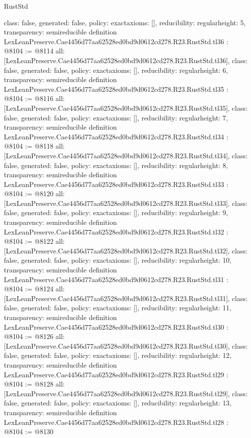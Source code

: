 \begin{lexlean}{RustStd}
\begin{coremodule}
{  class: false,
  generated: false,
  policy: exact{axioms: []},
  reducibility: regular{height: 5},
  transparency: semireducible
}
definition LexLeanPreserve.Cae4456d77aa62528ed0bd9d0612cd278.R23.RustStd.tl36 : @8104 := @8114 {
  all: [LexLeanPreserve.Cae4456d77aa62528ed0bd9d0612cd278.R23.RustStd.tl36],
  class: false,
  generated: false,
  policy: exact{axioms: []},
  reducibility: regular{height: 6},
  transparency: semireducible
}
definition LexLeanPreserve.Cae4456d77aa62528ed0bd9d0612cd278.R23.RustStd.tl35 : @8104 := @8116 {
  all: [LexLeanPreserve.Cae4456d77aa62528ed0bd9d0612cd278.R23.RustStd.tl35],
  class: false,
  generated: false,
  policy: exact{axioms: []},
  reducibility: regular{height: 7},
  transparency: semireducible
}
definition LexLeanPreserve.Cae4456d77aa62528ed0bd9d0612cd278.R23.RustStd.tl34 : @8104 := @8118 {
  all: [LexLeanPreserve.Cae4456d77aa62528ed0bd9d0612cd278.R23.RustStd.tl34],
  class: false,
  generated: false,
  policy: exact{axioms: []},
  reducibility: regular{height: 8},
  transparency: semireducible
}
definition LexLeanPreserve.Cae4456d77aa62528ed0bd9d0612cd278.R23.RustStd.tl33 : @8104 := @8120 {
  all: [LexLeanPreserve.Cae4456d77aa62528ed0bd9d0612cd278.R23.RustStd.tl33],
  class: false,
  generated: false,
  policy: exact{axioms: []},
  reducibility: regular{height: 9},
  transparency: semireducible
}
definition LexLeanPreserve.Cae4456d77aa62528ed0bd9d0612cd278.R23.RustStd.tl32 : @8104 := @8122 {
  all: [LexLeanPreserve.Cae4456d77aa62528ed0bd9d0612cd278.R23.RustStd.tl32],
  class: false,
  generated: false,
  policy: exact{axioms: []},
  reducibility: regular{height: 10},
  transparency: semireducible
}
definition LexLeanPreserve.Cae4456d77aa62528ed0bd9d0612cd278.R23.RustStd.tl31 : @8104 := @8124 {
  all: [LexLeanPreserve.Cae4456d77aa62528ed0bd9d0612cd278.R23.RustStd.tl31],
  class: false,
  generated: false,
  policy: exact{axioms: []},
  reducibility: regular{height: 11},
  transparency: semireducible
}
definition LexLeanPreserve.Cae4456d77aa62528ed0bd9d0612cd278.R23.RustStd.tl30 : @8104 := @8126 {
  all: [LexLeanPreserve.Cae4456d77aa62528ed0bd9d0612cd278.R23.RustStd.tl30],
  class: false,
  generated: false,
  policy: exact{axioms: []},
  reducibility: regular{height: 12},
  transparency: semireducible
}
definition LexLeanPreserve.Cae4456d77aa62528ed0bd9d0612cd278.R23.RustStd.tl29 : @8104 := @8128 {
  all: [LexLeanPreserve.Cae4456d77aa62528ed0bd9d0612cd278.R23.RustStd.tl29],
  class: false,
  generated: false,
  policy: exact{axioms: []},
  reducibility: regular{height: 13},
  transparency: semireducible
}
definition LexLeanPreserve.Cae4456d77aa62528ed0bd9d0612cd278.R23.RustStd.tl28 : @8104 := @8130 {
}
\end{coremodule}
\end{lexlean}
